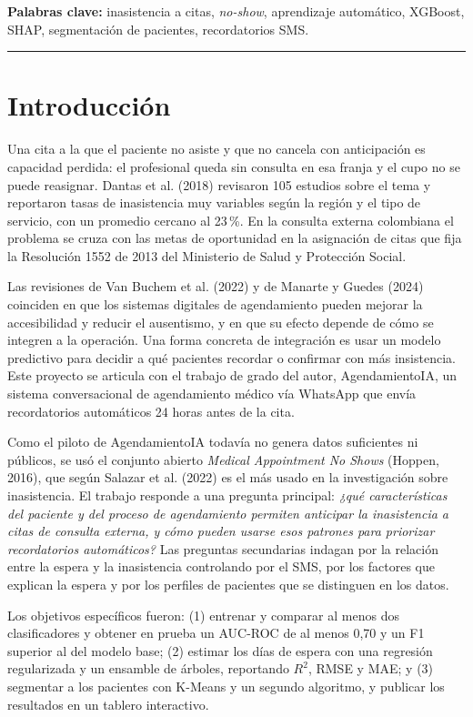 \documentclass[11pt,letterpaper]{article}
\begin{document}
\textbf{Palabras clave:} inasistencia a citas, \emph{no-show}, aprendizaje automático, XGBoost, SHAP, segmentación de pacientes, recordatorios SMS.

\noindent\rule{\textwidth}{0.4pt}

\section{Introducción}

Una cita a la que el paciente no asiste y que no cancela con anticipación es capacidad perdida: el profesional queda sin consulta en esa franja y el cupo no se puede reasignar. Dantas et al. (2018) revisaron 105 estudios sobre el tema y reportaron tasas de inasistencia muy variables según la región y el tipo de servicio, con un promedio cercano al 23\,\%. En la consulta externa colombiana el problema se cruza con las metas de oportunidad en la asignación de citas que fija la Resolución 1552 de 2013 del Ministerio de Salud y Protección Social.

Las revisiones de Van Buchem et al. (2022) y de Manarte y Guedes (2024) coinciden en que los sistemas digitales de agendamiento pueden mejorar la accesibilidad y reducir el ausentismo, y en que su efecto depende de cómo se integren a la operación. Una forma concreta de integración es usar un modelo predictivo para decidir a qué pacientes recordar o confirmar con más insistencia. Este proyecto se articula con el trabajo de grado del autor, AgendamientoIA, un sistema conversacional de agendamiento médico vía WhatsApp que envía recordatorios automáticos 24 horas antes de la cita.

Como el piloto de AgendamientoIA todavía no genera datos suficientes ni públicos, se usó el conjunto abierto \emph{Medical Appointment No Shows} (Hoppen, 2016), que según Salazar et al. (2022) es el más usado en la investigación sobre inasistencia. El trabajo responde a una pregunta principal: \emph{¿qué características del paciente y del proceso de agendamiento permiten anticipar la inasistencia a citas de consulta externa, y cómo pueden usarse esos patrones para priorizar recordatorios automáticos?} Las preguntas secundarias indagan por la relación entre la espera y la inasistencia controlando por el SMS, por los factores que explican la espera y por los perfiles de pacientes que se distinguen en los datos.

Los objetivos específicos fueron: (1) entrenar y comparar al menos dos clasificadores y obtener en prueba un AUC-ROC de al menos 0,70 y un F1 superior al del modelo base; (2) estimar los días de espera con una regresión regularizada y un ensamble de árboles, reportando $R^2$, RMSE y MAE; y (3) segmentar a los pacientes con K-Means y un segundo algoritmo, y publicar los resultados en un tablero interactivo.
\end{document}
